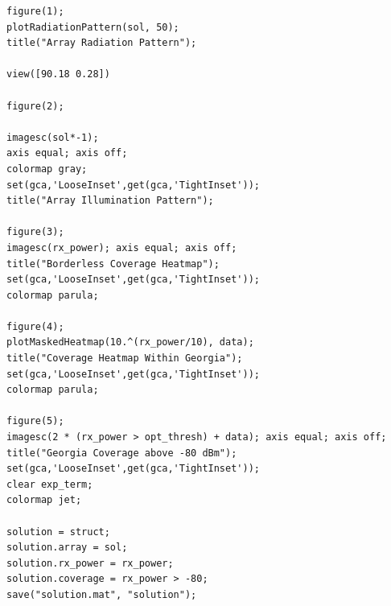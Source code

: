 \documentclass[12pt]{article}
\begin{document}
\begin{enumerate}
\begin{lstlisting}
figure(1);
plotRadiationPattern(sol, 50);
title("Array Radiation Pattern");

view([90.18 0.28])

figure(2);

imagesc(sol*-1);
axis equal; axis off;
colormap gray;
set(gca,'LooseInset',get(gca,'TightInset'));
title("Array Illumination Pattern");

figure(3);
imagesc(rx_power); axis equal; axis off;
title("Borderless Coverage Heatmap");
set(gca,'LooseInset',get(gca,'TightInset'));
colormap parula;

figure(4);
plotMaskedHeatmap(10.^(rx_power/10), data);
title("Coverage Heatmap Within Georgia");
set(gca,'LooseInset',get(gca,'TightInset'));
colormap parula;

figure(5);
imagesc(2 * (rx_power > opt_thresh) + data); axis equal; axis off;
title("Georgia Coverage above -80 dBm");
set(gca,'LooseInset',get(gca,'TightInset'));
clear exp_term;
colormap jet;

solution = struct;
solution.array = sol;
solution.rx_power = rx_power;
solution.coverage = rx_power > -80;
save("solution.mat", "solution");
    \end{lstlisting}

\end{enumerate}
\end{document}
